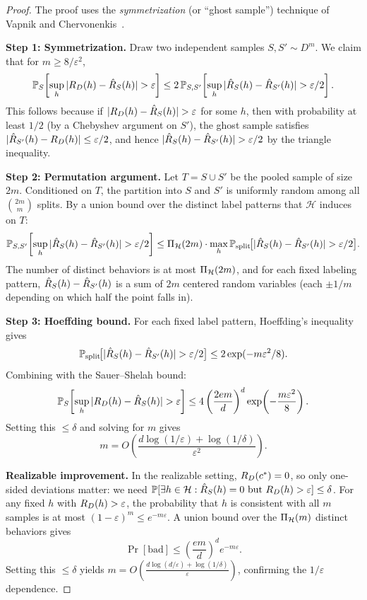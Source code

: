 \begin{proof}
The proof uses the \emph{symmetrization} (or ``ghost sample'') technique of
Vapnik and Chervonenkis~\cite{VapnikChervonenkis1971}.

\medskip
\noindent\textbf{Step 1: Symmetrization.}
Draw two independent samples $S, S' \sim D^m$.  We claim that for
$m \geq 8/\varepsilon^2$,
\[
  \mathbb{P}_S\!\left[\sup_{h} |R_D(h) - \hat{R}_S(h)| > \varepsilon\right]
  \leq 2\,\mathbb{P}_{S,S'}\!\left[
    \sup_h |\hat{R}_S(h) - \hat{R}_{S'}(h)| > \varepsilon/2
  \right].
\]
This follows because if $|R_D(h) - \hat{R}_S(h)| > \varepsilon$ for some
$h$, then with probability at least $1/2$ (by a Chebyshev argument on $S'$),
the ghost sample satisfies $|\hat{R}_{S'}(h) - R_D(h)| \leq
\varepsilon/2$, and hence $|\hat{R}_S(h) - \hat{R}_{S'}(h)| > \varepsilon/2$
by the triangle inequality.

\medskip
\noindent\textbf{Step 2: Permutation argument.}
Let $T = S \cup S'$ be the pooled sample of size $2m$.  Conditioned on $T$,
the partition into $S$ and $S'$ is uniformly random among all
$\binom{2m}{m}$ splits.  By a union bound over the distinct label patterns
that $\mathcal{H}$ induces on $T$:
\[
  \mathbb{P}_{S,S'}\!\left[\sup_h |\hat{R}_S(h) - \hat{R}_{S'}(h)| >
  \varepsilon/2\right]
  \leq \Pi_\mathcal{H}(2m) \cdot
  \max_h \mathbb{P}_{\text{split}}\!\bigl[|\hat{R}_S(h) - \hat{R}_{S'}(h)|
  > \varepsilon/2\bigr].
\]
The number of distinct behaviors is at most $\Pi_\mathcal{H}(2m)$, and for
each fixed labeling pattern, $\hat{R}_S(h) - \hat{R}_{S'}(h)$ is a sum of
$2m$ centered random variables (each $\pm 1/m$ depending on which half the
point falls in).

\medskip
\noindent\textbf{Step 3: Hoeffding bound.}
For each fixed label pattern, Hoeffding's inequality gives
\[
  \mathbb{P}_{\text{split}}\!\bigl[|\hat{R}_S(h) - \hat{R}_{S'}(h)| > \varepsilon/2\bigr]
  \leq 2\exp(-m\varepsilon^2/8).
\]
Combining with the Sauer--Shelah bound:
\[
  \mathbb{P}_S\!\left[\sup_h |R_D(h) - \hat{R}_S(h)| > \varepsilon\right]
  \leq 4 \left(\frac{2em}{d}\right)^d \exp\!\left(-\frac{m\varepsilon^2}{8}\right).
\]
Setting this $\leq \delta$ and solving for $m$ gives
\[
  m = O\!\left(\frac{d\log(1/\varepsilon) + \log(1/\delta)}{\varepsilon^2}\right).
\]

\medskip
\noindent\textbf{Realizable improvement.}
In the realizable setting, $R_D(c^*) = 0$, so only one-sided deviations
matter: we need $\mathbb{P}[\exists h \in \mathcal{H} : \hat{R}_S(h) = 0 \text{ but }
R_D(h) > \varepsilon] \leq \delta$.  For any fixed $h$ with $R_D(h) >
\varepsilon$, the probability that $h$ is consistent with all $m$ samples is at
most $(1 - \varepsilon)^m \leq e^{-m\varepsilon}$.  A union bound over the
$\Pi_\mathcal{H}(m)$ distinct behaviors gives
\[
  \Pr[\text{bad}] \leq \left(\frac{em}{d}\right)^d e^{-m\varepsilon}.
\]
Setting this $\leq \delta$ yields $m = O\!\left(\frac{d\log(d/\varepsilon) +
\log(1/\delta)}{\varepsilon}\right)$, confirming the $1/\varepsilon$
dependence.
\end{proof}

